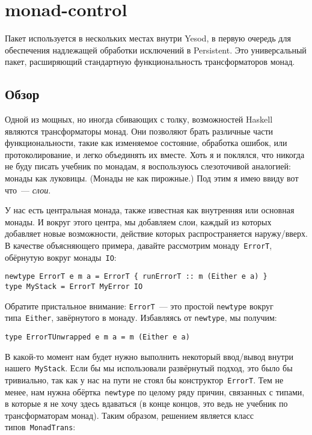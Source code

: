 \chapter{monad-control}\label{chap:monad-control}
Пакет
используется в нескольких местах внутри Yesod, в первую очередь для обеспечения
надлежащей обработки исключений в Persistent. Это универсальный пакет,
расширяющий стандартную функциональность трансформаторов монад.

\section{Обзор}
Одной из мощных, но иногда сбивающих с толку, возможностей Haskell являются
трансформаторы монад. Они позволяют брать различные части функциональности,
такие как изменяемое состояние, обработка ошибок, или протоколирование, и легко
объединять их вместе. Хоть я и поклялся, что никогда не буду писать учебник по
монадам, я воспользуюсь слезоточивой аналогией: монады как луковицы. (Монады не
как пирожные.) Под этим я имею ввиду вот что~--- \emph{слои}.

У нас есть центральная монада, также известная как внутренняя или основная
монады. И вокруг этого центра, мы добавляем слои, каждый из которых добавляет
новые возможности, действие которых распространяется наружу/вверх. В качестве
объясняющего примера, давайте рассмотрим монаду~\lstinline'ErrorT', обёрнутую
вокруг монады~\lstinline'IO':

\begin{lstlisting}
newtype ErrorT e m a = ErrorT { runErrorT :: m (Either e a) }
type MyStack = ErrorT MyError IO
\end{lstlisting}

Обратите пристальное внимание: \lstinline'ErrorT'~--- это простой
\lstinline'newtype' вокруг типа~\lstinline'Either', завёрнутого в монаду.
Избавляясь от \lstinline'newtype', мы получим:

\begin{lstlisting}
type ErrorTUnwrapped e m a = m (Either e a)
\end{lstlisting}

В какой-то момент нам будет нужно выполнить некоторый ввод/вывод внутри
нашего~\lstinline'MyStack'.  Если бы мы использовали развёрнутый подход, это
было бы тривиально, так как у нас на пути не стоял бы
конструктор~\lstinline'ErrorT'. Тем не менее, нам нужна
обёртка~\lstinline'newtype' по целому ряду причин, связанных с типами, в
которые я не хочу здесь вдаваться (в конце концов, это ведь не учебник по
трансформаторам монад). Таким образом, решением является класс
типов~\lstinline'MonadTrans':

